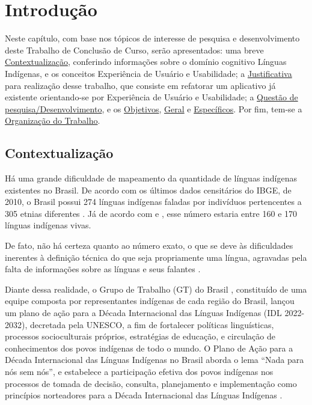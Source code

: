 \chapter[Introdução]{Introdução}

Neste capítulo, com base nos tópicos de interesse de pesquisa e desenvolvimento deste Trabalho de Conclusão de Curso, serão apresentados: uma breve
\hyperref[sec:Contextualização]{Contextualização}, conferindo informações sobre o domínio cognitivo Línguas Indígenas, e os conceitos Experiência de Usuário e
Usabilidade; a \hyperref[sec:Justificativa]{Justificativa} para realização desse trabalho, que consiste em refatorar um aplicativo já existente orientando-se por
Experiência de Usuário e Usabilidade; a \hyperref[sec:QuestaodePesquisa]{Questão de pesquisa/Desenvolvimento}, e os \hyperref[sec:Objetivos]{Objetivos},
\hyperref[sec:ObjetivoGeral]{Geral} e \hyperref[sec:ObjetivosEspecificos]{Específicos}. Por fim, tem-se a \hyperref[sec:OrganizacaodoTrabalho]{Organização do Trabalho}.

\section{Contextualização}
\label{sec:Contextualização}

Há uma grande dificuldade de mapeamento da quantidade de línguas indígenas existentes no Brasil. De acordo com os últimos dados censitários do IBGE, de 2010, o Brasil
possui 274 línguas indígenas faladas por indivíduos pertencentes a 305 etnias diferentes \cite{ibge}. Já de acordo com \cite{galucioetal2018} e \cite{dangelis2014}, esse
número estaria entre 160 e 170 línguas indígenas vivas.

De fato, não há certeza quanto ao número exato, o que se deve às dificuldades inerentes à definição técnica do que seja propriamente uma língua, agravadas pela falta de
informações sobre as línguas e seus falantes \cite{seki2000}.

Diante dessa realidade, o Grupo de Trabalho (GT) do Brasil \cite{gtbrasil2021}, constituído de uma equipe composta por representantes indígenas de cada região do Brasil,
lançou um plano de ação para a Década Internacional das Línguas Indígenas (IDL 2022-2032), decretada pela UNESCO, a fim de fortalecer políticas linguísticas, processos
socioculturais próprios, estratégias de educação, e circulação de conhecimentos dos povos indígenas de todo o mundo. O Plano de Ação para a Década Internacional das
Línguas Indígenas no Brasil aborda o lema “Nada para nós sem nós”, e estabelece a participação efetiva dos povos indígenas nos processos de tomada de decisão, consulta,
planejamento e implementação como princípios norteadores para a Década Internacional das Línguas Indígenas \cite{gtbrasil2021}.

